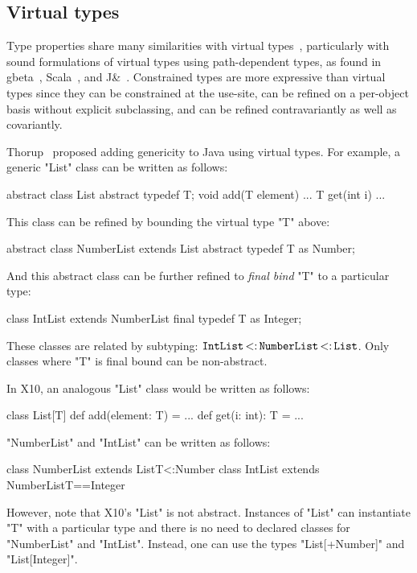 \documentclass[preprint,nocopyrightspace,9pt]{sigplanconf}
\begin{document}
\subsection{Virtual types}

Type properties share many similarities with virtual types~\cite{mp89-virtual-classes,beta}, particularly
with sound formulations of virtual types using path-dependent types,
as found in gbeta~\cite{ernst99-gbeta}, Scala~\cite{scala},
and J\&~\cite{nqm06}.
%
Constrained types are more expressive than virtual
types since they can be constrained at the use-site,
can be refined on a per-object basis without explicit subclassing,
and can be refined contravariantly
as well as covariantly.

Thorup~\cite{thorup97}
proposed adding genericity to Java using virtual types.  For example,
a generic \xcd"List" class can be written as follows:
\begin{xten}
abstract class List {
    abstract typedef T;
    void add(T element) { ... }
    T get(int i) { ... }
}
\end{xten}
This class can be refined by bounding the virtual type \xcd"T" above:
\begin{xten}
abstract class NumberList extends List {
    abstract typedef T as Number;
}
\end{xten}
And this abstract class can be further refined to \emph{final bind}
\xcd"T" to a particular type:
\begin{xten}
class IntList extends NumberList {
    final typedef T as Integer;
}
\end{xten}
These classes are related by subtyping:
${\tt IntList} \subtype {\tt NumberList} \subtype {\tt List}$.
Only classes where \xcd"T" is final bound can be non-abstract.

In X10, an analogous \xcd"List" class would be written as follows:
\begin{xten}
class List[T] {
    def add(element: T) = { ... }
    def get(i: int): T = { ... }
}
\end{xten}

\xcd"NumberList" and \xcd"IntList" can be written as follows:
\begin{xten}
class NumberList extends List{T<:Number} { }
class IntList extends NumberList{T==Integer} { }
\end{xten}

However, note that X10's \xcd"List" is not abstract.
Instances of \xcd"List"
can instantiate \xcd"T" with a particular type and there is no need to declared classes for \xcd"NumberList" and \xcd"IntList".  Instead, one can use the types
\xcd"List[+Number]" and \xcd"List[Integer]".
\end{document}
